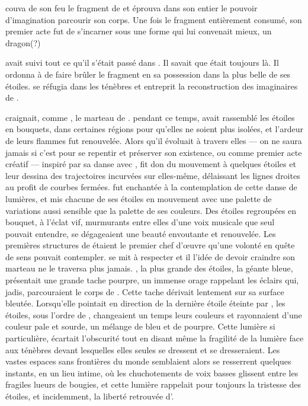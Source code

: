 \Ogo couva de son feu le fragment de \Drisst et éprouva dans son entier le pouvoir d'imagination parcourir son corps. Une fois le fragment entièrement consumé, son premier acte fut de s'incarner sous une forme qui lui convenait mieux, un dragon(?)


\Cind avait suivi tout ce qu'il s'était passé dans \Dreyma. Il savait que \Ogo était toujours là. Il ordonna à \Carac de faire brûler le fragment en sa possession dans la plus belle de ses étoiles. \Shuru se réfugia dans les ténèbres et entreprit la reconstruction des imaginaires de \Mey. 

\Ogo craignait, comme \Shuru, le marteau de \Carac. \Carac pendant ce temps, avait rassemblé les étoiles en bouquets, dans certaines régions pour qu'elles ne soient plus isolées, et l'ardeur de leurs flammes fut renouvelée. Alors qu'il évoluait à travers elles --- on ne saura jamais si c'est pour se repentir et préserver son existence, ou comme premier acte créatif --- inspiré par sa danse avec \Drisst, \Ogo fit don du mouvement à quelques étoiles et leur dessina des trajectoires incurvées sur elles-même, délaissant les lignes droites au profit de courbes fermées. \Carac fut enchantée à la contemplation de cette danse de lumières, et mis chacune de ses étoiles en mouvement avec une palette de variations aussi sensible que la palette de ses couleurs. Des étoiles regroupées en bouquet, à l'éclat vif, murmurants entre elles d'une voix musicale que seul \Carac pouvait entendre, se dégageaient une beauté envoutante et renouvelée. Les premières structures de \Dreyma étaient le premier chef d'œuvre qu'une volonté en quête de sens pouvait contempler. \Ogo se mit à respecter \Carac et il l'idée de devoir craindre son marteau ne le traversa plus jamais. \Boromil, la plus grande des étoiles, la géante bleue, présentait une grande tache pourpre, un immense orage rappelant les éclairs qui, jadis, parcouraient le corps de \Boromu. Cette tache dérivait lentement sur sa surface bleutée. Lorsqu'elle pointait en direction de la dernière étoile éteinte par \Shuru, les étoiles, sous l'ordre de \Carac, changeaient un temps leurs couleurs et rayonnaient d'une couleur pale et sourde, un mélange de bleu et de pourpre. Cette lumière si particulière, écartait l'obscurité tout en disant même la fragilité de la lumière face aux ténèbres devant lesquelles elles seules se dressent et se dresseraient. Les vastes espaces sans frontières du monde semblaient alors se resserrent quelques instants, en un lieu intime, où les chuchotements de voix basses glissent entre les fragiles lueurs de bougies, et cette lumière rappelait pour toujours la tristesse des étoiles, et incidemment, la liberté retrouvée d'\Ogo.

